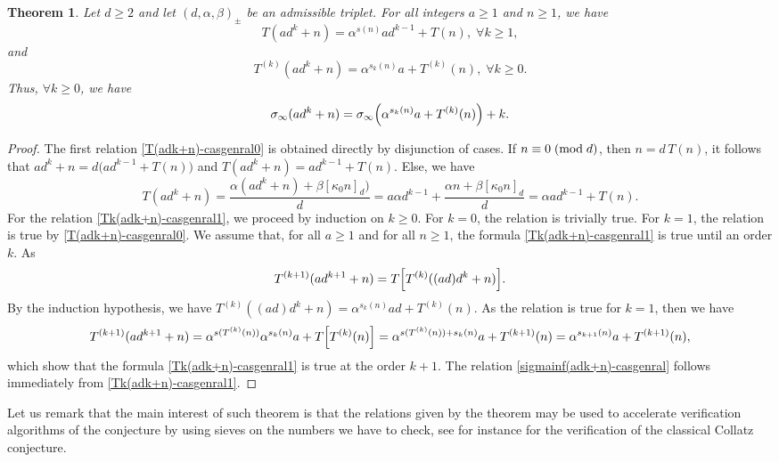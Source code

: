\documentclass[11pt,a4paper]{article}
\newtheorem{theorem}{Theorem}[section]
\newcommand*\modd[3]{#1\equiv#2\;( {\rm mod}\;  #3)}
\begin{document}
\begin{theorem}
	Let $d\geq 2$ and  let $(d,\alpha,\beta)_{\pmb{\pm}}$ be an admissible  triplet. For all integers $a\geq 1$ and $n\geq 1$, we have 
	\begin{equation}\label{T(adk+n)-casgenral0}
		T(ad^k+n)= \alpha^{s(n)}ad^{k-1}+T(n),\;\forall  k\geq 1,
	\end{equation}
	and 
	\begin{equation}\label{Tk(adk+n)-casgenral1}
		T^{(k)}(ad^k+n)= \alpha^{s_k(n)}a+T^{(k)}(n),\;\forall  k\geq 0.
	\end{equation}
	Thus, $\forall  k\geq 0$, we have
	\begin{equation}\label{sigmainf(adk+n)-casgenral}
		\sigma_\infty(ad^k+n)=\sigma_\infty\Bigl(\alpha^{s_k(n)}a+T^{(k)}(n)\Bigr)+k.
	\end{equation}
\end{theorem}
\begin{proof}
	The first relation \eqref{T(adk+n)-casgenral0} is obtained directly by disjunction of cases. If  $\modd{n}{0}{d}$, then
	$n = d\,T(n)$, it follows that  $ad^k+n=d\bigl(ad^{k-1}+T(n)\bigr)$ and  $T(ad^k+n)= ad^{k-1}+T(n)$. Else, we have   
	$$T(ad^k+n)=\dfrac{\alpha (ad^k+n)+\beta [\kappa_0 n]_d)}{d}=
	a\alpha d^{k-1}+ \dfrac{\alpha n +\beta [\kappa_0 n]_d}{d}= \alpha  a d^{k-1}+T(n).$$
	For the relation \eqref{Tk(adk+n)-casgenral1}, we proceed by induction on $k\geq 0$. For $k=0$, the relation is trivially true. For $k=1$,
	the relation is true by \eqref{T(adk+n)-casgenral0}.
	We assume that, for all $a\geq 1$  and for all $n\geq 1$,
	the formula \eqref{Tk(adk+n)-casgenral1} is true until an order $k$.   As
	$$T^{(k+1)}(ad^{k+1}+n)=T\Bigl[T^{(k)}((ad)d^{k}+n)\Bigr].$$
	By the induction hypothesis, we have $T^{(k)}((ad)d^{k}+n)=\alpha^{s_k(n)}ad+T^{(k)}(n)$. As the relation is true for $k=1$, then we have
	$$T^{(k+1)}(ad^{k+1}+n)=\alpha^{s(T^{(k)}(n))}\alpha^{s_k(n)}a+T\Bigl[T^{(k)}(n)\Bigr]=\alpha^{s(T^{(k)}(n))+s_k(n)}a+T^{(k+1)}(n)=\alpha^{s_{k+1}(n)}a+T^{(k+1)}(n),$$
	which show that the formula \eqref{Tk(adk+n)-casgenral1} is true at the order $k+1$.
	The relation 
	\eqref{sigmainf(adk+n)-casgenral} follows immediately from
	\eqref{Tk(adk+n)-casgenral1}.\hfill\end{proof}

Let us remark that the main interest of such theorem is that the relations given by the theorem  may be used to accelerate verification algorithms of the conjecture by using sieves on the numbers we have to check, see for instance \cite{Barina2021} for the verification of the classical Collatz conjecture.
\end{document}
